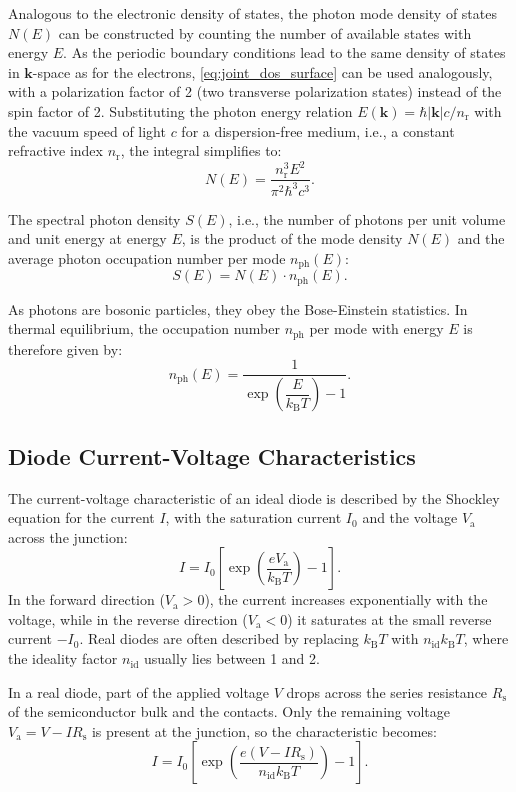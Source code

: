 Analogous to the electronic density of states, the photon mode density of states $N
(E)$ can be constructed by counting the number of available states with energy $E$.
As the periodic boundary conditions lead to the same density of states in
$\mathbf{k}$-space as for the electrons, \cref{eq:joint_dos_surface} can be used
analogously, with a polarization factor of 2 (two transverse polarization states)
instead of the spin factor of 2. Substituting the photon energy relation
$E(\mathbf{k})=\hbar \lvert \mathbf{k}\rvert c /n_{\mathrm{r}}$ with the vacuum speed
of light $c$ for a dispersion-free medium, i.e., a constant refractive index
$n_{\mathrm{r}}$, the integral simplifies to:
\begin{equation}
	N(E)=\frac{n_{\mathrm{r}}^{3}E^{2}}{\pi^{2}\hbar^{3}c^{3}}.
\end{equation}

The spectral photon density $S(E)$, i.e., the number of photons per unit volume and
unit energy at energy $E$, is the product of the mode density $N(E)$ and the average
photon occupation number per mode $n_{\mathrm{ph}}(E)$:
\begin{equation}
	S(E)=N(E) \cdot n_{\mathrm{ph}}(E).
\end{equation}

As photons are bosonic particles, they obey the Bose-Einstein statistics. In thermal
equilibrium, the occupation number $n_{\mathrm{ph}}$
per mode with energy $E$ is therefore given by:
\begin{equation}
	n_{\mathrm{ph}}(E)=\frac{1}{\exp\left( \dfrac{E}{k_{\mathrm{B}}T} \right) - 1}.
\end{equation}

\subsection{Diode Current-Voltage Characteristics}
\label{sec:carrier_injection}

The current-voltage characteristic of an ideal diode is described by the
Shockley equation for the current $I$, with the saturation current $I_{0}$ and the
voltage $V_{\mathrm{a}}$ across the junction:
\begin{equation}
	I = I_{0}\left[ \exp\left(\frac{eV_{\mathrm{a}}}{k_{\mathrm{B}}T}\right) - 1 \right
	].
\end{equation}
In the forward direction ($V_{\mathrm{a}}> 0$), the current increases
exponentially with the voltage, while in the reverse direction ($V_{\mathrm{a}}< 0$)
it saturates at the small reverse current $-I_{0}$. Real diodes are often
described by replacing $k_{\mathrm{B}}T$ with $n_{\mathrm{id}}k_{\mathrm{B}}T$, where
the ideality factor $n_{\mathrm{id}}$ usually lies between 1 and 2.

In a real diode, part of the applied voltage $V$ drops across the series resistance
$R_{\mathrm{s}}$ of the semiconductor bulk and the contacts. Only the remaining
voltage $V_{\mathrm{a}}= V - IR_{\mathrm{s}}$ is present at the junction, so the characteristic
becomes:
\begin{equation}
	I = I_{0}\left[\exp\left(\frac{e(V - IR_{\mathrm{s}})}{n_{\mathrm{id}} k_{\mathrm{B}}T}\right) -
	1\right].
	\label{eq:schockley_real}
\end{equation}